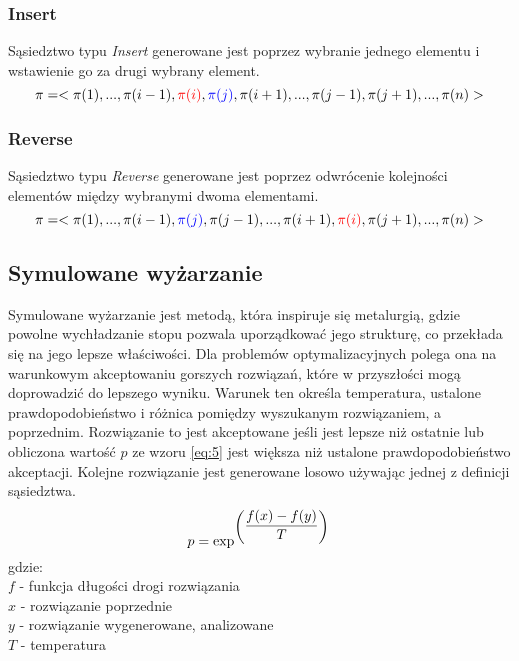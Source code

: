 \documentclass[12pt]{article}
\begin{document}
\subsubsection{Insert}
Sąsiedztwo typu \textit{Insert} generowane jest poprzez wybranie jednego elementu i wstawienie go za drugi wybrany element.
\begin{equation}
    \label{eq:3}
    \pi=<\pi(1),...,\pi(i-1),\mathbin{\color{red}\pi(i)},\mathbin{\color{blue}\pi(j)},\pi(i+1),...,\pi(j-1),\pi(j+1),...,\pi(n)>
\end{equation}
\subsubsection{Reverse}
Sąsiedztwo typu \textit{Reverse} generowane jest poprzez odwrócenie kolejności elementów między wybranymi dwoma elementami.
\begin{equation}
    \label{eq:4}
    \pi=<\pi(1),...,\pi(i-1),\mathbin{\color{blue}\pi(j)},\pi(j-1),...,\pi(i+1),\mathbin{\color{red}\pi(i)},\pi(j+1),...,\pi(n)>
\end{equation}
\subsection{Symulowane wyżarzanie}

Symulowane wyżarzanie jest metodą, która inspiruje się metalurgią, gdzie powolne wychładzanie stopu pozwala uporządkować jego strukturę, co przekłada się na jego lepsze właściwości.
Dla problemów optymalizacyjnych polega ona na warunkowym akceptowaniu gorszych rozwiązań, które w przyszłości mogą doprowadzić do lepszego wyniku. Warunek ten określa temperatura, ustalone prawdopodobieństwo i różnica pomiędzy wyszukanym rozwiązaniem, a poprzednim.
Rozwiązanie to jest akceptowane jeśli jest lepsze niż ostatnie lub obliczona wartość $p$ ze wzoru \ref{eq:5} jest większa niż ustalone prawdopodobieństwo akceptacji. Kolejne rozwiązanie jest generowane losowo używając jednej z definicji sąsiedztwa.
\begin{equation}
    \label{eq:5}
    p = \exp^{\left(\dfrac{f(x)-f(y)}{T}\right)}\\
\end{equation}
gdzie:\\
$f$ - funkcja długości drogi rozwiązania\\
$x$ - rozwiązanie poprzednie\\
$y$ - rozwiązanie wygenerowane, analizowane\\
$T$ - temperatura
\end{document}
